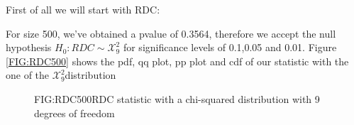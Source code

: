 First of all we will start with RDC:

For size 500, we've obtained a pvalue of 0.3564, therefore we accept the null hypothesis $H_{0}: RDC\sim \mathcal{X}^{2}_{9}$ for significance levels of 0.1,0.05 and 0.01. Figure \ref{FIG:RDC500} shows the pdf, qq plot, pp plot and cdf of our statistic with the one of the $\mathcal{X}^{2}_{9}$distribution

\begin{figure}[RDC Asymptotic distribution]{FIG:RDC500}{RDC statistic with a chi-squared distribution with 9 degrees of freedom}
\end{figure}






